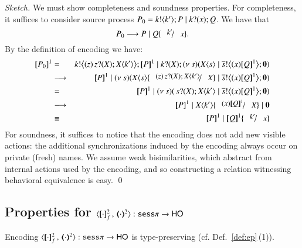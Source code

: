 \begin{proof}[Sketch]
	We must show completeness and soundness properties. 
	For completeness, it suffices to consider source process
	$P_0 = k ! \langle k' \rangle ; P \;|\; k ? (x) ; Q$. We have that
%
	\[
		P_0 \red P \Par Q\subst{k'}{x}.
	\]
%
	By the definition of encoding we have:
	\begin{eqnarray*}
		\pmap{P_0}{1} & = & \bbout{k}{ \abs{z}{\,\binp{z}{X} \appl{X}{k'}} } \pmap{P}{1} \Par \binp{k}{X} \newsp{s}{\appl{X}{s} \Par \bbout{\dual{s}}{\abs{x} \pmap{Q}{1}} \inact}  \\
		& \red & \pmap{P}{1} \Par \newsp{s}{\appl{X}{s} \subst{\abs{z}{\,\binp{z}{X} \appl{X}{k'}}}{X} \Par \bbout{\dual{s}}{\abs{x} \pmap{Q}{1}} \inact} \\
		& = & \pmap{P}{1} \Par \newsp{s}{\,\binp{s}{X} \appl{X}{k'} \Par \bbout{\dual{s}}{\abs{x} \pmap{Q}{1}} \inact} \\
		& \red & \pmap{P}{1} \Par \appl{X}{k'} \subst{\abs{x} \pmap{Q}{1}}{X} \Par \inact \\
		& \scong & \pmap{P}{1} \Par \pmap{Q}{1}\subst{k'}{x}  
	\end{eqnarray*}
	For soundness, it suffices to notice that the encoding does not add new visible actions:
	the additional synchronizations induced by the encoding always occur on private (fresh) names.
	We assume weak bisimilarities, which abstract from internal actions used by the encoding,
	and so  constructing a relation witnessing behavioral equivalence is easy.
	\qed
\end{proof}


\subsection{Properties for $\fencod{\cdot}{\cdot}{2}{f}: \sesp \to \HO$}
\label{app:enc_sesp_to_HO}

\begin{proposition}\rm
	\label{app:enc_sesp_to_HO_t}
	Encoding $\fencod{\cdot}{\cdot}{2}{f}: \sesp \to \HO$  
	is type-preserving (cf. Def.~\ref{def:ep}\,(1)).
\end{proposition}

